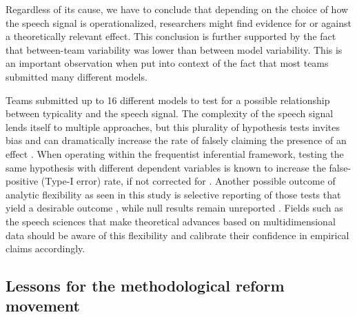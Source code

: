 \documentclass[Review,times,sageh]{sagej}
\begin{document}
Regardless of its cause, we have to conclude that depending on the choice of how the speech signal is operationalized, researchers might find evidence for or against a theoretically relevant effect.
This conclusion is further supported by the fact that between-team variability was lower than between model variability.
This is an important observation when put into context of the fact that most teams submitted many different models.

Teams submitted up to 16 different models to test for a possible relationship between typicality and the speech signal.
The complexity of the speech signal lends itself to multiple approaches, but this plurality of hypothesis tests invites bias and can dramatically increase the rate of falsely claiming the presence of an effect \citep{roettger2019researcher}.
When operating within the frequentist inferential framework, testing the same hypothesis with different dependent variables is known to increase the false-positive (Type-I error) rate, if not corrected for \citep{tukey1953}.
Another possible outcome of analytic flexibility as seen in this study is selective reporting of those tests that yield a desirable outcome \citep[\citet{john2012measuring}, \citet{simmons2011false}]{kerr1998harking}, while null results remain unreported \citep[e.g.,][\citet{rosenthal1979file}]{sterling1959publication}.
Fields such as the speech sciences that make theoretical advances based on multidimensional data should be aware of this flexibility and calibrate their confidence in empirical claims accordingly.

\hypertarget{lessons-for-the-methodological-reform-movement}{%
\subsection{Lessons for the methodological reform movement}\label{lessons-for-the-methodological-reform-movement}}
\end{document}
